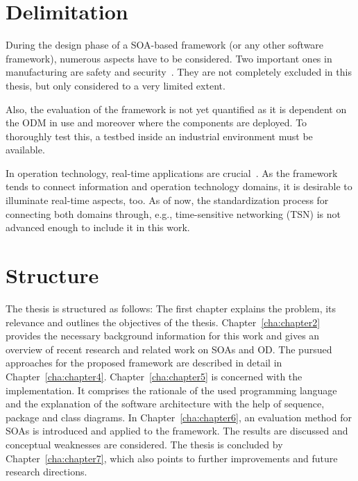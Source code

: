 \section{Delimitation}
During the design phase of a SOA-based framework (or any other software framework), numerous aspects have to be considered. Two important ones in manufacturing are safety and security~\cite{Hornberg2017HandbookVision}. They are not completely excluded in this thesis, but only considered to a very limited extent.

Also, the evaluation of the framework is not yet quantified as it is dependent on the ODM in use and moreover where the components are deployed. To thoroughly test this, a testbed inside an industrial environment must be available.

In operation technology, real-time applications are crucial~\cite{Wilmes2019ZauberwortKonvergenz}. As the framework tends to connect information and operation technology domains, it is desirable to illuminate real-time aspects, too. As of now, the standardization process for connecting both domains through, e.g., time-sensitive networking (TSN) is not advanced enough to include it in this work.

\section{Structure}
The thesis is structured as follows: The first chapter explains the problem, its relevance and outlines the objectives of the thesis. Chapter~\ref{cha:chapter2} provides the necessary background information for this work and gives an overview of recent research and related work on SOAs and OD. The pursued approaches for the proposed framework are described in detail in Chapter~\ref{cha:chapter4}. Chapter~\ref{cha:chapter5} is concerned with the implementation. It comprises the rationale of the used programming language and the explanation of the software architecture with the help of sequence, package and class diagrams. In Chapter~\ref{cha:chapter6}, an evaluation method for SOAs is introduced and applied to the framework. The results are discussed and conceptual weaknesses are considered. The thesis is concluded by Chapter~\ref{cha:chapter7}, which also points to further improvements and future research directions.
